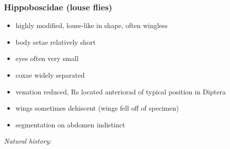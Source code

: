 \documentclass[letterpaper, 11pt]{article}
\begin{document}
\subsubsection{Hippoboscidae (louse flies)}
\begin{itemize}
\item highly modified, louse-like in shape, often wingless 
\item body setae relatively short
\item eyes often very small
\item coxae widely separated
\item venation reduced, Rs located anteriorad of typical position in Diptera
\item wings sometimes dehiscent (wings fell off of specimen)
\item segmentation on abdomen indistinct
\end{itemize}

\noindent{}\textit{Natural history:} \\
\end{document}
